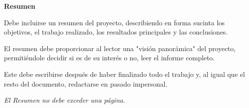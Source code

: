 \begin{center}\huge{\textbf{Resumen}}\end{center}

\noindent
Debe incluirse un resumen del proyecto, describiendo en forma sucinta los objetivos, el trabajo realizado, los resultados principales y las conclusiones.

El resumen debe proporcionar al lector una "visión panorámica" del proyecto, permitiéndole decidir si es de su interés o no, leer el informe completo.

Este debe escribirse después de haber finalizado todo el trabajo y, al igual que el resto del documento, redactarse en pasado impersonal.
 
\emph{El Resumen no debe exceder una página.}
